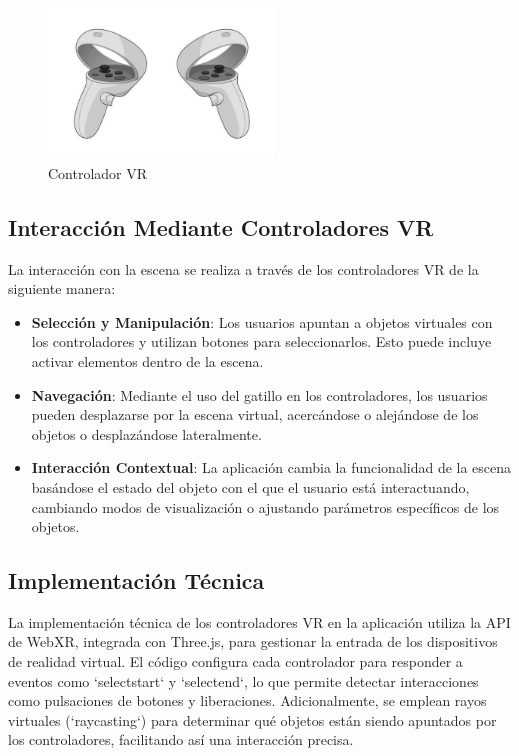 \documentclass[a4paper, 12pt]{book}
\begin{document}
\begin{figure}
  \centering
  \includegraphics[width=6cm, keepaspectratio]{img/controlador.png}
  \caption{Controlador VR}
  \label{fig:controlador}
\end{figure}


\subsection{Interacción Mediante Controladores VR}
\label{subsec:interaccion_controladores_vr}

La interacción con la escena se realiza a través de los controladores VR de la siguiente manera:

\begin{itemize}
  \item \textbf{Selección y Manipulación}: Los usuarios apuntan a objetos virtuales con los controladores y utilizan 
  botones para seleccionarlos. Esto puede incluye activar elementos dentro de la escena.
  \item \textbf{Navegación}: Mediante el uso del gatillo en los controladores, 
  los usuarios pueden desplazarse por la escena virtual, acercándose o alejándose de los objetos o desplazándose lateralmente.
  \item \textbf{Interacción Contextual}: La aplicación cambia la funcionalidad de la escena 
  basándose el estado del objeto con el que el usuario está interactuando, 
  cambiando modos de visualización o ajustando parámetros específicos de los objetos.
\end{itemize}

\subsection{Implementación Técnica}
\label{subsec:implementacion_tecnica_vr}

La implementación técnica de los controladores VR en la aplicación utiliza la API de WebXR, integrada con Three.js, para gestionar la entrada 
de los dispositivos de realidad virtual. El código configura cada controlador para responder a eventos como `selectstart` y `selectend`, 
lo que permite detectar interacciones como pulsaciones de botones y liberaciones. Adicionalmente, se emplean rayos virtuales (`raycasting`) 
para determinar qué objetos están siendo apuntados por los controladores, facilitando así una interacción precisa.
\end{document}
